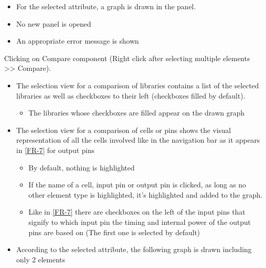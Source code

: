\documentclass[10pt,a4paper]{report}
\begin{document}
\begin{FR}
{\begin{itemize}
\begin{itemize}
                \item For internal power: power groups(fall-power, power and/or rise-power)
                \item For timing: timing-sense (positive-unate, negative-unate and/or non-unate) timing-type(combinational, three-state-enable, etc.) and then timing groups (cell-fall, cell-rise, fall-transition, rise-transition, etc)
            \end{itemize}
            \item For the selected attribute, a graph is drawn in the panel.
        \end{itemize}}
    {\begin{itemize}
        \item No new panel is opened
        \item An appropriate error message is shown
    \end{itemize}}
    {Clicking on Compare component (Right click after selecting multiple elements >> Compare).}
    {\begin{itemize}
        \item The selection view for a comparison of libraries contains a list of the selected libraries as well as checkboxes to their left (checkboxes filled by default).
        \begin{itemize}
            \item The libraries whose checkboxes are filled appear on the drawn graph
        \end{itemize}
        \item The selection view for a comparison of cells or pins shows the visual representation of all the cells involved like in the navigation bar as it appears in \ref{FR-7} for output pins
        \begin{itemize}
            \item By default, nothing is highlighted
            \item If the name of a cell, input pin or output pin is clicked, as long as no other element type is highlighted, it's highlighted and added to the graph.
            \item Like in \ref{FR-7} there are checkboxes on the left of the input pins that signify to which input pin the timing and internal power of the output pins are based on (The first one is selected by default)
        \end{itemize}
        \item According to the selected attribute, the following graph is drawn including only 2 elements

\end{itemize}}
\end{FR}
\end{document}
